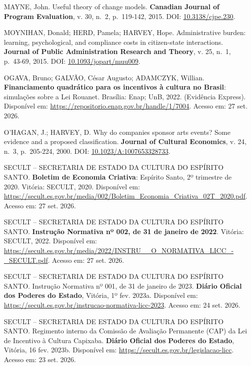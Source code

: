 \documentclass[12pt,a4paper]{article}
\newenvironment{referencias}{\raggedright\setlength{\parindent}{0pt}\setlength{\parskip}{0.5\baselineskip}}{\par}
\begin{document}
\begin{referencias}
\protect{}\label{ref-mayne-25}{}MAYNE, John. Useful theory of change models.
\textbf{Canadian Journal of Program Evaluation}, v. 30, n.~2, p.~119-142, 2015. DOI:
\href{https://doi.org/10.3138/cjpe.230}{10.3138/cjpe.230}.

\protect{}\label{ref-moynihan-26}{}MOYNIHAN, Donald; HERD, Pamela; HARVEY, Hope.
Administrative burden: learning, psychological, and compliance costs in citizen-state interactions.
\textbf{Journal of Public Administration Research and Theory}, v. 25, n.~1, p.~43-69, 2015. DOI:
\href{https://doi.org/10.1093/jopart/muu009}{10.1093/jopart/muu009}.

\protect{}\label{ref-ogava-27}{}OGAVA, Bruno; GALVÃO, César Augusto; ADAMCZYK, Willian.
\textbf{Financiamento quadrático para os incentivos à cultura no Brasil}: simulações sobre a Lei
Rouanet. Brasília: Enap; UnB, 2022. (Evidência Express). Disponível em:
\url{https://repositorio.enap.gov.br/handle/1/7004}. Acesso em: 27 set. 2026.

\protect{}\label{ref-o-hagan-28}{}O'HAGAN, J.; HARVEY, D. Why do companies sponsor arts
events? Some evidence and a proposed classification. \textbf{Journal of Cultural Economics}, v. 24,
n.~3, p.~205-224, 2000. DOI:
\href{https://doi.org/10.1023/A:1007653328733}{10.1023/A:1007653328733}.

\protect{}\label{ref-secult-29}{}SECULT -- SECRETARIA DE ESTADO DA CULTURA DO ESPÍRITO
SANTO. \textbf{Boletim de Economia Criativa}: Espírito Santo, 2º trimestre de 2020. Vitória: SECULT,
2020. Disponível em:
\url{https://secult.es.gov.br/media/002/Boletim_Economia_Criativa_02T_2020.pdf}. Acesso em: 27 set.
2026.

\protect{}\label{ref-secult-30}{}SECULT -- SECRETARIA DE ESTADO DA CULTURA DO ESPÍRITO
SANTO. \textbf{Instrução Normativa nº 002, de 31 de janeiro de 2022}. Vitória: SECULT, 2022.
Disponível em: \url{https://secult.es.gov.br/media/2022/INSTRU__O_NORMATIVA_LICC_-_SECULT.pdf}.
Acesso em: 27 set. 2026.

\protect{}\label{ref-secult-31}{}SECULT -- SECRETARIA DE ESTADO DA CULTURA DO ESPÍRITO
SANTO. Instrução Normativa nº 001, de 31 de janeiro de 2023. \textbf{Diário Oficial dos Poderes do
Estado}, Vitória, 1º fev. 2023a. Disponível em:
\url{https://secult.es.gov.br/instrucao-normativa-licc-2023}. Acesso em: 24 set. 2026.

\protect{}\label{ref-secult-32}{}SECULT -- SECRETARIA DE ESTADO DA CULTURA DO ESPÍRITO
SANTO. Regimento interno da Comissão de Avaliação Permanente (CAP) da Lei de Incentivo à Cultura
Capixaba. \textbf{Diário Oficial dos Poderes do Estado}, Vitória, 16 fev. 2023b. Disponível em:
\url{https://secult.es.gov.br/legislacao-licc}. Acesso em: 23 set. 2026.


\end{referencias}
\end{document}
